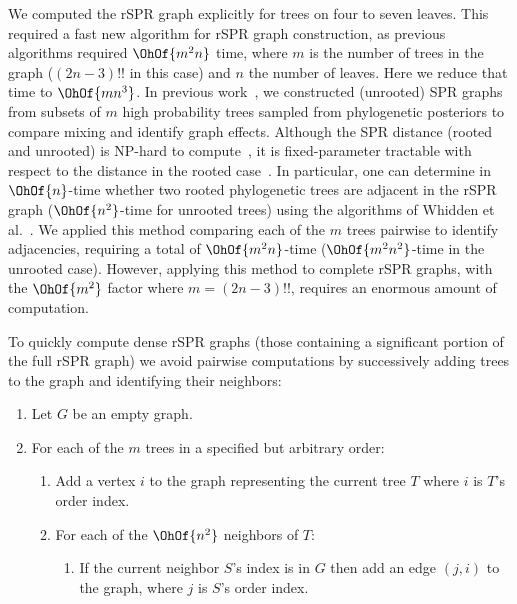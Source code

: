 \documentclass[11pt,onecolumn,conference]{IEEEtran}
\newcommand{\cuttable}[2][]{%
    \ifthenelse{\equal{#1}{}}%
		{}%
		{#1}%
}
\begin{document}
We computed the rSPR graph explicitly for trees on four to seven leaves.
This required a fast new algorithm for rSPR graph construction, as previous algorithms required $\OhOf{m^2 n}$ time, where $m$ is the number of trees in the graph ($(2n-3)!!$ in this case) and $n$ the number of leaves.
Here we reduce that time to $\OhOf{mn^3}$.
In previous work~\cite{Whidden2015-yi}, we constructed (unrooted) SPR graphs from subsets of $m$ high probability trees sampled from phylogenetic posteriors to compare mixing and identify graph effects.
Although the SPR distance (rooted and unrooted) is NP-hard to compute~\cite{bordewich05,hickey2008sdc}, it is fixed-parameter tractable with respect to the distance in the rooted case~\cite{bordewich05}.
In particular, one can determine in $\OhOf{n}$-time whether two rooted phylogenetic trees are adjacent in the rSPR graph ($\OhOf{n^2}$-time for unrooted trees) using the algorithms of Whidden et al.~\cite{whidden2009unifying,whidden2010fast, whidden2013hybridization,Whidden2015-yi}.
We applied this method comparing each of the $m$ trees pairwise to identify adjacencies, requiring a total of $\OhOf{m^2n}$-time ($\OhOf{m^2 n^2}$-time in the unrooted case).
However, applying this method to complete rSPR graphs, with the $\OhOf{m^2}$ factor where $m = (2n-3)!!$, requires an enormous amount of computation.

To quickly compute dense rSPR graphs (those containing a significant portion of the full rSPR graph) we avoid pairwise computations by successively adding trees to the graph and \cuttable{efficiently }identifying their neighbors:
\begin{enumerate}[label={\arabic*}.]
	\item Let $G$ be an empty graph.
	\item For each of the $m$ trees in a specified but arbitrary order:
		\begin{enumerate}
			\item Add a vertex $i$ to the graph representing the current tree $T$ where $i$ is $T$'s order index.
			\item For each of the $\OhOf{n^2}$ neighbors of $T$:
				\begin{enumerate}
					\item If the current neighbor $S$'s index is in $G$ then add an edge $(j,i)$ to the graph, where $j$ is $S$'s order index.
				\end{enumerate}
		\end{enumerate}
\end{enumerate}
\end{document}
